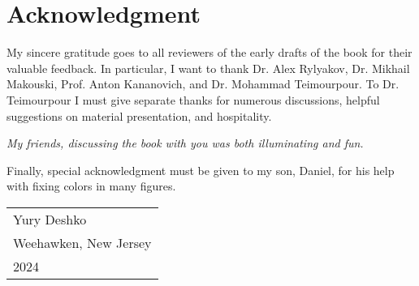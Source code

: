 \section*{Acknowledgment}
My sincere gratitude goes to all reviewers of the early drafts of
the book for their valuable feedback. In particular, I want to thank Dr. Alex
Rylyakov, Dr. Mikhail Makouski, Prof. Anton Kananovich,
and Dr. Mohammad Teimourpour. To Dr. Teimourpour I must give separate
thanks for numerous discussions, helpful suggestions on material
presentation, and hospitality.

\emph{My friends, discussing the book with you was both illuminating
and fun.}

Finally, special acknowledgment must be given to my son, Daniel, for
his help with fixing colors in many figures.

\begin{flushright}
  \begin{tabular}{@{}l@{}}
    Yury Deshko\\
    Weehawken, New Jersey\\
    2024
  \end{tabular}
\end{flushright}
